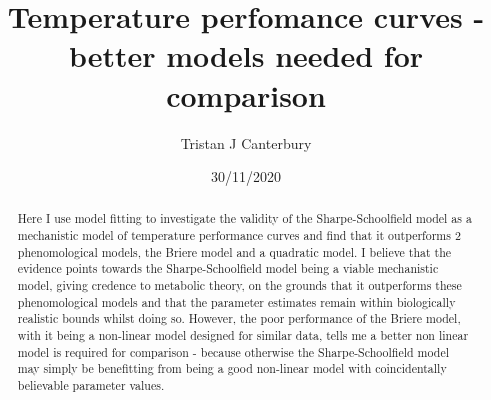\documentclass[12pt]{article}\usepackage[]{graphicx}\usepackage[]{color}
\title{Temperature perfomance curves - better models needed for comparison}
\author{Tristan J Canterbury}
\date{30/11/2020}
\begin{document}
  \maketitle

  \begin{abstract}
  Here I use model fitting to investigate the validity of the Sharpe-Schoolfield model as a mechanistic model of temperature performance curves 
  and find that it outperforms 2 phenomological models, the Briere model and a quadratic model.
  I believe that the evidence points towards the Sharpe-Schoolfield model being a viable mechanistic model, giving credence
  to metabolic theory, on the grounds that it outperforms 
  these phenomological models and that the parameter estimates remain within biologically realistic bounds whilst doing so. 
  However, the poor performance of the Briere model, with it being a non-linear 
  model designed for similar data, tells me a better non linear model is required for comparison - because otherwise 
  the Sharpe-Schoolfield model may simply be benefitting from being a good non-linear model with coincidentally believable 
  parameter values.  

  \end{abstract}
\end{document}
